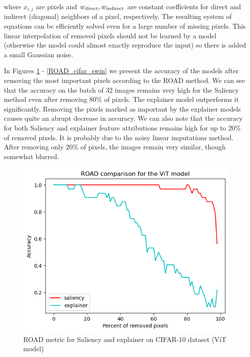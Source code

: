 \documentclass[magisterska,en]{pracamgr}
\begin{document}
where $x_{i,j}$ are pixels and $w_{\textup{direct}}, w_{\textup{indirect}}$ are constant coefficients for direct and indirect (diagonal) neighbors of a pixel, respectively. The resulting system of equations can be efficiently solved even for a large number of missing pixels. This linear interpolation of removed pixels should not be learned by a model (otherwise the model could almost exactly reproduce the input) so there is added a small Gaussian noise.

In Figures \ref{ROAD_cifar_vit} - \ref{ROAD_cifar_swin} we present the accuracy of the models after removing the most important pixels according to the ROAD method. We can see that the accuracy on the batch of 32 images remains very high for the Saliency method even after removing 80\% of pixels. The explainer model outperforms it significantly. Removing the pixels marked as important by the explainer models causes quite an abrupt decrease in accuracy. We can also note that the accuracy for both Saliency and explainer feature attributions remains high for up to 20\% of removed pixels. It is probably due to the noisy linear imputations method. After removing only 20\% of pixels, the images remain very similar, though somewhat blurred.


\begin{figure}[H]
\centering
\includegraphics[scale=0.5]{./images/ROAD_cifar_vit.png}
\caption{ROAD metric for Saliency and explainer on CIFAR-10 dataset (ViT model)}
\label{ROAD_cifar_vit}
\end{figure}
\end{document}
